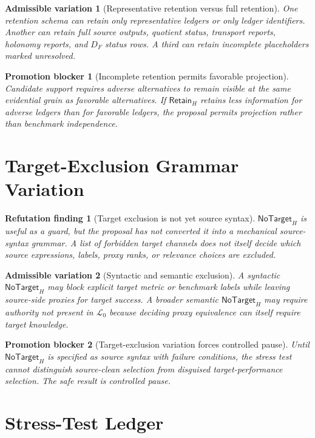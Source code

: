 \documentclass[11pt]{article}
\newcommand{\Lang}{\mathcal{L}_{0}}
\newcommand{\RetainH}{\mathsf{Retain}_{H}}
\newcommand{\NoTargetH}{\mathsf{NoTarget}_{H}}
\newtheorem{finding}{Refutation finding}
\newtheorem{variation}{Admissible variation}
\newtheorem{blocker}{Promotion blocker}
\begin{document}
\begin{variation}[Representative retention versus full retention]
One retention schema can retain only representative ledgers or only ledger
identifiers. Another can retain full source outputs, quotient status,
transport reports, holonomy reports, and \(D_F\) status rows. A third can
retain incomplete placeholders marked unresolved.
\end{variation}

\begin{blocker}[Incomplete retention permits favorable projection]
Candidate support requires adverse alternatives to remain visible at the
same evidential grain as favorable alternatives. If \(\RetainH\) retains
less information for adverse ledgers than for favorable ledgers, the
proposal permits projection rather than benchmark independence.
\end{blocker}

\section{Target-Exclusion Grammar Variation}

\begin{finding}[Target exclusion is not yet source syntax]
\(\NoTargetH\) is useful as a guard, but the proposal has not converted it
into a mechanical source-syntax grammar. A list of forbidden target channels
does not itself decide which source expressions, labels, proxy ranks, or
relevance choices are excluded.
\end{finding}

\begin{variation}[Syntactic and semantic exclusion]
A syntactic \(\NoTargetH\) may block explicit target metric or benchmark
labels while leaving source-side proxies for target success. A broader
semantic \(\NoTargetH\) may require authority not present in \(\Lang\)
because deciding proxy equivalence can itself require target knowledge.
\end{variation}

\begin{blocker}[Target-exclusion variation forces controlled pause]
Until \(\NoTargetH\) is specified as source syntax with failure conditions,
the stress test cannot distinguish source-clean selection from disguised
target-performance selection. The safe result is controlled pause.
\end{blocker}

\section{Stress-Test Ledger}
\end{document}
